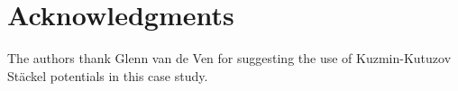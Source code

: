 \section{Acknowledgments}

The authors thank Glenn van de Ven for suggesting the use of Kuzmin-Kutuzov St\"{a}ckel potentials in this case study. 

